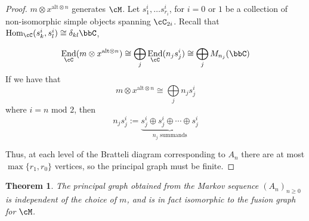 \documentclass[11pt]{article}
\theoremstyle{plain}
\newtheorem{thm}{Theorem}[]
\theoremstyle{definition}
\DeclareMathOperator{\End}{End}
\DeclareMathOperator{\Hom}{Hom}
\newcommand{\xalt}{x^{\text{alt}\otimes n}}
\begin{document}
\begin{proof}
$m\otimes \xalt$ generates $\cM$. Let $s^i_1,\ldots s^i_{r_i}$, for $i=0$ or $1$ be a collection of non-isomorphic simple objects spanning $\cC_{2i}$. Recall that $\Hom_{\cC}(s^i_k,s^i_l)\cong \delta_{kl}\bbC$, 

$$\End_{\cC}(m\otimes\xalt)\cong \bigoplus\limits_{j}\End_{\cC}(n_j s^i_j) \cong \bigoplus\limits_{j}M_{n_j}(\bbC)$$
If we have that 
$$m \otimes \xalt \cong \bigoplus\limits_{j}n_js^i_j$$
	where $i=n\text{ mod }2$, then 
$$n_js^i_j:=\underbrace{s^i_j\oplus s^i_j\oplus \cdots \oplus s^i_j}_{n_j \,\, \text{summands}}$$

Thus, at each level of the Bratteli diagram corresponding to $A_n$ %
	there are at most $\max\{r_1,r_0\}$ vertices, so the principal graph must be finite. %
\end{proof}

\begin{thm}
The principal graph obtained from the Markov sequence $(A_n)_{n\geq 0}$ is independent of the choice of $m$, and is in fact isomorphic to the fusion graph for $\cM$.
\end{thm}
\end{document}
